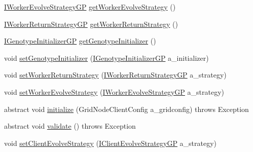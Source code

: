 \begin{DoxyCompactItemize}
\hyperlink{interfaceorg_1_1jgap_1_1distr_1_1grid_1_1gp_1_1_i_worker_evolve_strategy_g_p}{I\-Worker\-Evolve\-Strategy\-G\-P} \hyperlink{classorg_1_1jgap_1_1distr_1_1grid_1_1gp_1_1_grid_configuration_g_p_base_abb0a209fe24562b90f407697bd9a34b4}{get\-Worker\-Evolve\-Strategy} ()
\item 
\hyperlink{interfaceorg_1_1jgap_1_1distr_1_1grid_1_1gp_1_1_i_worker_return_strategy_g_p}{I\-Worker\-Return\-Strategy\-G\-P} \hyperlink{classorg_1_1jgap_1_1distr_1_1grid_1_1gp_1_1_grid_configuration_g_p_base_a761bebd9450232d43b59bc5a1c1be457}{get\-Worker\-Return\-Strategy} ()
\item 
\hyperlink{interfaceorg_1_1jgap_1_1distr_1_1grid_1_1gp_1_1_i_genotype_initializer_g_p}{I\-Genotype\-Initializer\-G\-P} \hyperlink{classorg_1_1jgap_1_1distr_1_1grid_1_1gp_1_1_grid_configuration_g_p_base_a455e7f4846c1e800e4ebb78ee2e985fb}{get\-Genotype\-Initializer} ()
\item 
void \hyperlink{classorg_1_1jgap_1_1distr_1_1grid_1_1gp_1_1_grid_configuration_g_p_base_a839342cc5113f9bbaaa30b71f2c75416}{set\-Genotype\-Initializer} (\hyperlink{interfaceorg_1_1jgap_1_1distr_1_1grid_1_1gp_1_1_i_genotype_initializer_g_p}{I\-Genotype\-Initializer\-G\-P} a\-\_\-initializer)
\item 
void \hyperlink{classorg_1_1jgap_1_1distr_1_1grid_1_1gp_1_1_grid_configuration_g_p_base_a4bcfd84a2595e9f07f5dde7229a97d38}{set\-Worker\-Return\-Strategy} (\hyperlink{interfaceorg_1_1jgap_1_1distr_1_1grid_1_1gp_1_1_i_worker_return_strategy_g_p}{I\-Worker\-Return\-Strategy\-G\-P} a\-\_\-strategy)
\item 
void \hyperlink{classorg_1_1jgap_1_1distr_1_1grid_1_1gp_1_1_grid_configuration_g_p_base_aa94f963f18f0444689ed2437efbf0720}{set\-Worker\-Evolve\-Strategy} (\hyperlink{interfaceorg_1_1jgap_1_1distr_1_1grid_1_1gp_1_1_i_worker_evolve_strategy_g_p}{I\-Worker\-Evolve\-Strategy\-G\-P} a\-\_\-strategy)
\item 
abstract void \hyperlink{classorg_1_1jgap_1_1distr_1_1grid_1_1gp_1_1_grid_configuration_g_p_base_a5302c00da0ca0fc17e3e0e16c0b898eb}{initialize} (Grid\-Node\-Client\-Config a\-\_\-gridconfig)  throws Exception
\item 
abstract void \hyperlink{classorg_1_1jgap_1_1distr_1_1grid_1_1gp_1_1_grid_configuration_g_p_base_abfb1b66ff707003ebbdbd8a848b76969}{validate} ()  throws Exception
\item 
void \hyperlink{classorg_1_1jgap_1_1distr_1_1grid_1_1gp_1_1_grid_configuration_g_p_base_ad95b01ac2c5895fd079281ba9e402b13}{set\-Client\-Evolve\-Strategy} (\hyperlink{interfaceorg_1_1jgap_1_1distr_1_1grid_1_1gp_1_1_i_client_evolve_strategy_g_p}{I\-Client\-Evolve\-Strategy\-G\-P} a\-\_\-strategy)

\end{DoxyCompactItemize}
